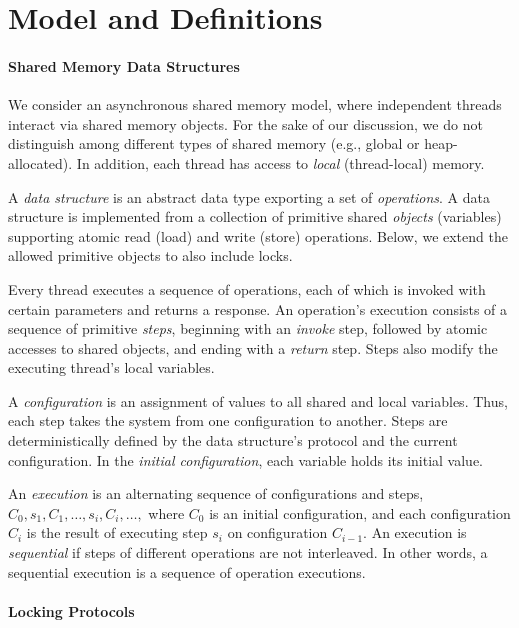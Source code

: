 \section{Model and Definitions}\label{sec:model}


\paragraph{Shared Memory Data Structures}

We consider an asynchronous shared memory model, where independent threads interact via shared memory objects.
For the sake of our discussion, we do not distinguish among different types of shared memory (e.g., global or heap-allocated).
In addition, each thread has access to \emph{local} (thread-local) memory.

A \emph{data structure} is an abstract data type exporting a set of \emph{operations}.
A data structure is implemented from a collection of primitive shared
\emph{objects} (variables) supporting atomic read (load) and write (store)
operations.
Below, we extend the allowed primitive objects to also include locks.

Every thread executes a sequence of operations, each of which is invoked with certain parameters and returns a response.
An operation's execution consists of a sequence of primitive \emph{steps}, beginning with an \emph{invoke} step, followed by
atomic accesses to shared objects, and ending with a \emph{return} step. Steps also modify the executing thread's local variables.

A \emph{configuration} is an assignment of values to all shared and local variables. Thus, each step takes the system from one
configuration to another. Steps are deterministically defined by the data structure's protocol and the current configuration.
In the \emph{initial configuration}, each variable holds its initial value.

An \emph{execution} is an alternating sequence of configurations and steps,
$C_0,s_1,C_1, \ldots,s_i,C_i,\ldots,$
where $C_0$ is an initial configuration,
and each configuration $C_i$ is the result of
executing step $s_i$ on configuration $C_{i-1}$.
An execution is \emph{sequential} if steps of different operations are not interleaved.
In other words, a sequential execution is a sequence of operation executions.

\paragraph{Locking Protocols}

